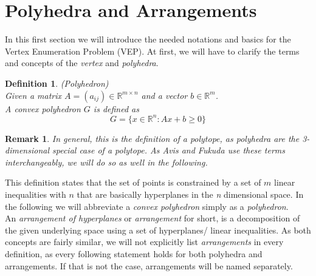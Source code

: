 \documentclass[a4paper, 11pt]{article}
\newtheorem{mydef}{Definition}
\newtheorem*{remark}{Remark}
\begin{document}
\section{Polyhedra and Arrangements}
In this first section we will introduce the needed notations and basics for the Vertex Enumeration Problem (VEP). At first, we will have to clarify the terms and concepts of the \textit{vertex} and \textit{polyhedra}.

\begin{mydef}(Polyhedron)\\
	Given a matrix $A=(a_{ij}) \in \mathbb{R}^{m\times n}$ and a vector $b \in \mathbb{R}^m$.\\
	
	A \textit{convex polyhedron} $G$ is defined as
	\begin{equation}
		G = \{ x\in \mathbb{R}^n: Ax+b\geq 0 \}
	\end{equation}
\end{mydef}
\begin{remark}
	
	In general, this is the definition of a polytope, as polyhedra are the 3-dimensional special case of a polytope. As Avis and Fukuda use these terms interchangeably, we will do so as well in the following. 
\end{remark}

This definition states that the set of points is constrained by a set of $m$ linear inequalities with $n$ that are basically hyperplanes in the \textit{n} dimensional space. In the following we will abbreviate a \textit{convex polyhedron} simply as a \textit{polyhedron}. \\

An \textit{arrangement of hyperplanes} or \textit{arrangement} for short, is a decomposition of the given underlying space using a set of hyperplanes/ linear inequalities. As both concepts are fairly similar, we will not explicitly list \textit{arrangements} in every definition, as every following statement holds for both polyhedra and arrangements. If that is not the case, arrangements will be named separately.\\
\end{document}
